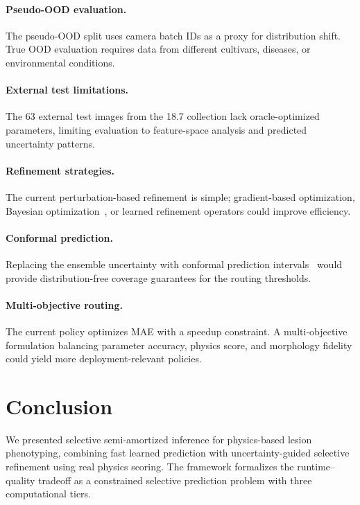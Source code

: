 \documentclass[11pt,a4paper]{article}
\begin{document}
\paragraph{Pseudo-OOD evaluation.}
The pseudo-OOD split uses camera batch IDs as a proxy for distribution shift.
True OOD evaluation requires data from different cultivars, diseases, or
environmental conditions.

\paragraph{External test limitations.}
The 63 external test images from the 18.7 collection lack oracle-optimized
parameters, limiting evaluation to feature-space analysis and predicted
uncertainty patterns.

\paragraph{Refinement strategies.}
The current perturbation-based refinement is simple; gradient-based
optimization, Bayesian optimization~\cite{shahriari2016taking},
or learned refinement operators could improve efficiency.

\paragraph{Conformal prediction.}
Replacing the ensemble uncertainty with conformal prediction
intervals~\cite{angelopoulos2023conformal} would provide
distribution-free coverage guarantees for the routing thresholds.

\paragraph{Multi-objective routing.}
The current policy optimizes MAE with a speedup constraint.
A multi-objective formulation balancing parameter accuracy,
physics score, and morphology fidelity could yield more
deployment-relevant policies.

\section{Conclusion}

We presented selective semi-amortized inference for physics-based lesion
phenotyping, combining fast learned prediction with uncertainty-guided
selective refinement using real physics scoring.
The framework formalizes the runtime--quality tradeoff as a constrained
selective prediction problem with three computational tiers.
\end{document}
